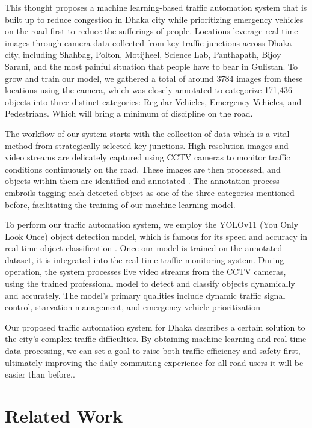 \documentclass[conference]{IEEEtran}
\begin{document}
This thought proposes a machine learning-based traffic automation system that is built up to reduce congestion in Dhaka city while prioritizing emergency vehicles on the road first to reduce the sufferings of people. Locations leverage real-time images through camera data collected from key traffic junctions across Dhaka city, including Shahbag, Polton, Motijheel, Science Lab, Panthapath, Bijoy Sarani, and the most painful situation that people have to bear in Gulistan. To grow and train our model, we gathered a total of around 3784 images from these locations using the camera, which was closely annotated to categorize 171,436 objects into three distinct categories: Regular Vehicles, Emergency Vehicles, and Pedestrians. Which will bring a minimum of discipline on the road.


The workflow of our system starts with the collection of data which is a vital method from strategically selected key junctions. High-resolution images and video streams are delicately captured using CCTV cameras to monitor traffic conditions continuously on the road. These images are then processed, and objects within them are identified and annotated \cite{clar:a3}. The annotation process embroils tagging each detected object as one of the three categories mentioned before, facilitating the training of our machine-learning model. 


To perform our traffic automation system, we employ the YOLOv11 (You Only Look Once) object detection model, which is famous for its speed and accuracy in real-time object classification \citep{clar:a4}. Once our model is trained on the annotated dataset, it is integrated into the real-time traffic monitoring system. During operation, the system processes live video streams from the CCTV cameras, using the trained professional model to detect and classify objects dynamically and accurately. The model's primary qualities include dynamic traffic signal control, starvation management, and emergency vehicle prioritization


Our proposed traffic automation system for Dhaka describes a certain solution to the city's complex traffic difficulties. By obtaining machine learning and real-time data processing, we can set a goal to raise both traffic efficiency and safety first, ultimately improving the daily commuting experience for all road users it will be easier than before..

\section{Related Work}
\end{document}
